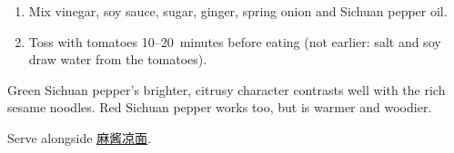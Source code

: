 \label{jiangcu-fanqie}

\begin{ingredients}
\end{ingredients}


\begin{recipe}
  \begin{enumerate}

  \item Mix vinegar, soy sauce, sugar, ginger, spring onion and
    Sichuan pepper oil.

  \item Toss with tomatoes 10--20~minutes before eating (not
    earlier: salt and soy draw water from the tomatoes).

  \end{enumerate}
\end{recipe}

\notes{} Green Sichuan pepper's brighter, citrusy character
contrasts well with the rich sesame noodles. Red Sichuan pepper
works too, but is warmer and woodier.

Serve alongside \hyperref[majiang-liangmian]{麻酱凉面}.

